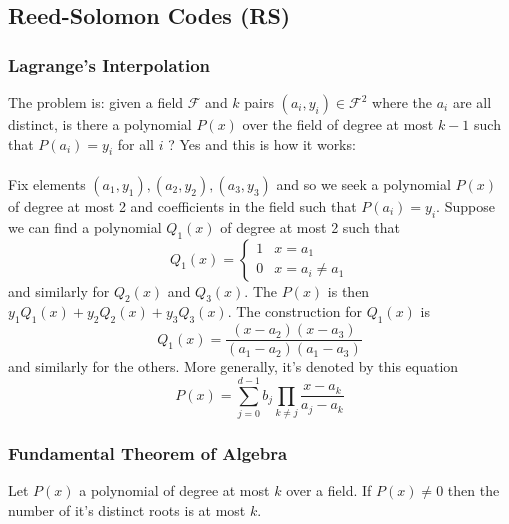 \documentclass{article}
\begin{document}
\subsection{Reed-Solomon Codes (RS)}
\subsubsection{Lagrange's Interpolation} The problem is: given a field $ \mathcal{F} $ and $ k $ pairs $ (a_i,y_i) \in \mathcal{F}^2 $ where the $ a_i $ are all distinct, is there a polynomial $ P(x) $ over the field of degree at most $ k - 1 $ such that $ P(a_i) = y_i $ for all $ i $ ? Yes and this is how it works:
\\
\\
Fix elements $ (a_1,y_1),(a_2,y_2),(a_3,y_3) $ and so we seek a polynomial $ P(x) $ of degree at most 2 and coefficients in the field such that $ P(a_i) = y_i $. Suppose we can find a polynomial $ Q_1(x) $ of degree at most 2 such that
\begin{equation}
Q_1(x) = \left\{
    \begin{array}{ll}
        1 & x = a_1 \\
        0 & x = a_i \neq a_1
    \end{array}
\right.
\end{equation}
and similarly for $ Q_2(x) $ and $ Q_3(x) $. The $ P(x) $ is then $ y_1Q_1(x) + y_2Q_2(x) + y_3Q_3(x) $. The construction for $ Q_1(x) $ is
\begin{equation}
Q_1(x) = \frac{(x - a_2)(x - a_3)}{(a_1 - a_2)(a_1 - a_3)}
\end{equation}
and similarly for the others. More generally, it's denoted by this equation
\begin{equation}
P(x) = \sum_{j=0}^{d-1} b_j \prod_{k \neq j} \frac{x - a_k}{a_j - a_k}
\end{equation}

\subsubsection{Fundamental Theorem of Algebra}
\begin{tcolorbox}[sharp corners, colback=green!30, colframe=green!80!blue, title=Fundamental Theorem of Algebra]
Let $ P(x) $ a polynomial of degree at most $ k $ over a field. If $ P(x) \neq 0 $ then the number of it's distinct roots is at most $ k $.
\end{tcolorbox}
\end{document}
